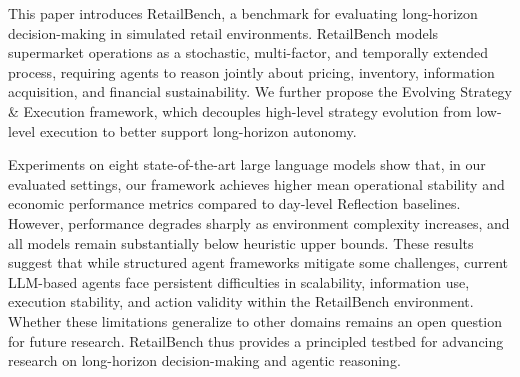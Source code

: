This paper introduces RetailBench, a benchmark for evaluating long-horizon decision-making in simulated retail environments. RetailBench models supermarket operations as a stochastic, multi-factor, and temporally extended process, requiring agents to reason jointly about pricing, inventory, information acquisition, and financial sustainability. We further propose the Evolving Strategy \& Execution framework, which decouples high-level strategy evolution from low-level execution to better support long-horizon autonomy.

Experiments on eight state-of-the-art large language models show that, in our evaluated settings, our framework achieves higher mean operational stability and economic performance metrics compared to day-level Reflection baselines. However, performance degrades sharply as environment complexity increases, and all models remain substantially below heuristic upper bounds. These results suggest that while structured agent frameworks mitigate some challenges, current LLM-based agents face persistent difficulties in scalability, information use, execution stability, and action validity within the RetailBench environment. Whether these limitations generalize to other domains remains an open question for future research. RetailBench thus provides a principled testbed for advancing research on long-horizon decision-making and agentic reasoning.
